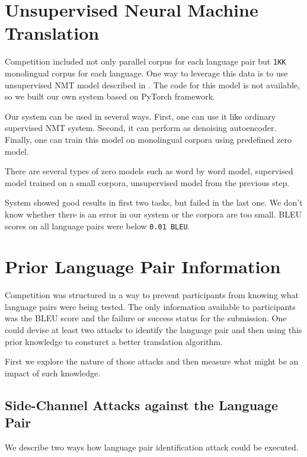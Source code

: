 \documentclass[]{article}
\begin{document}
\section{Unsupervised Neural Machine Translation}
\label{sect:unmt}

Competition included not only parallel corpus for each language pair but  {\tt 1KK} monolingual corpus for each language. One way to leverage this data is to use unsupervised NMT model described in \cite{DBLP:journals/corr/abs-1711-00043}. The code for this model is not available, so we built our own system based on PyTorch framework. 

Our system can be used in several ways. First, one can use it like ordinary supervised NMT system. Second, it can perform as denoising autoencoder. Finally, one can train this model on monolingual corpora using predefined zero model.

There are several types of zero models such as word by word model, supervised model trained on a small corpora, unsupervised model from the previous step.

System showed good results in first two tasks, but failed in the last one. We don't know whether there is an error in our system or the corpora are too small. BLEU scores on all language pairs were below {\tt 0.01 BLEU}.

\section{Prior Language Pair Information}
\label{sect:nonoblivious}

Competition was structured in a way to prevent participants from knowing what language pairs were being tested.
The only information available to participants was the BLEU score and the failure or success status for the submission.
One could devise at least two attacks to identify the language pair and then using this prior knowledge to consturct a better translation algorithm.

First we explore the nature of those attacks and then measure what might be an impact of such knowledge.

\subsection{Side-Channel Attacks against the Language Pair}
\label{sect:attack}

We describe two ways how language pair identification attack could be executed.
\end{document}
